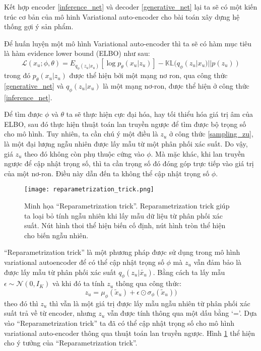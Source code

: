     Kết hợp encoder \ref{inference_net} và decoder \ref{generative_net} lại ta sẽ có một kiến trúc cơ bản của mô hinh Variational auto-encoder cho bài toán xây dựng hệ thống gợi ý sản phẩm.

    Để huấn luyện một mô hình Variational auto-encoder thì ta sẽ có hàm mục tiêu là hàm evidence lower bound (ELBO) như sau:
    \begin{equation}
        \label{elbo_mvae}
        \mathcal{L}(x_u;\phi,\theta) = E_{q_\phi(z_u|x_u)}[\log p_\theta(x_u|z_u)] - \mathbb{KL}(q_\phi(z_u|x_u) || p(z_u))
    \end{equation}
    trong đó $p_\theta(x_u|z_u)$ được thể hiện bởi một mạng nơ ron, qua công thức \ref{generative_net} và $q_\phi(z_u|x_u)$ là một mạng nơ-ron, được thể hiện ở công thức \ref{inference_net}.

    Để tìm được $\phi$ và $\theta$ ta sẽ thực hiện cực đại hóa, hay tối thiểu hóa giá trị âm của ELBO, sau đó thực hiện thuật toán lan truyền ngược để tìm được bộ trọng số cho mô hình. 
    Tuy nhiên, ta cần chú ý một điều là $z_u$ ở công thức \ref{sampling_zu}, là một đại lượng ngẫu nhiên được lấy mẫu từ một phân phối xác suất.
    Do vậy, giá $z_u$ theo đó không còn phụ thuộc cứng vào $\phi$.
    Mà mặc khác, khi lan truyền ngược để cập nhật trọng số, thì ta cần trọng số đó đóng góp trực tiếp vào giá trị của một nơ-ron.
    Điều này dẫn đến ta không thể cập nhật trọng số $\phi$. 
    \begin{figure}
        \centering
        \texttt{[image: reparametrization\_trick.png]}
        \caption{Minh họa ``Reparametrization trick''. Reparametrization trick giúp ta loại bỏ tính ngẫu nhiên khi lấy mẫu dữ liệu từ phân phối xác suất. Nút hình thoi thể hiện biến cố định, nút hình tròn thể hiện cho biến ngẫu nhiên.}
        \label{fig_repatrick}
    \end{figure}
    ``Reparametrization trick'' là một phương pháp được sử dụng trong mô hình variational autoencoder để có thể cập nhật trọng số $\phi$ mà $z_u$ vẫn đảm bảo là được lấy mẫu từ phân phối xác suất $q_\phi(z_u|\tilde{x_u})$. 
    Bằng cách ta lấy mẫu $\epsilon \sim \mathcal{N}(0,I_K)$ và khi đó ta tính $z_u$ thông qua công thức:
    \begin{equation}
        z_u = \mu_\phi(\tilde{x}_u) + \epsilon \odot \sigma_\phi(\tilde{x}_u))
    \end{equation}
    theo đó thì $z_u$ thì vẫn là một giá trị được lấy mẫu ngẫu nhiên từ phân phối xác suất trả về từ encoder, nhưng $z_u$ vẫn được tính thông qua một dấu bằng `='.
    Dựa vào ``Reparametrization trick'' ta đã có thể cập nhật trọng số cho mô hình variational auto-encoder thông qua thuật toán lan truyền ngược. 
    Hình \ref{fig_repatrick} thể hiện cho ý tưởng của ``Reparametrization trick''.
